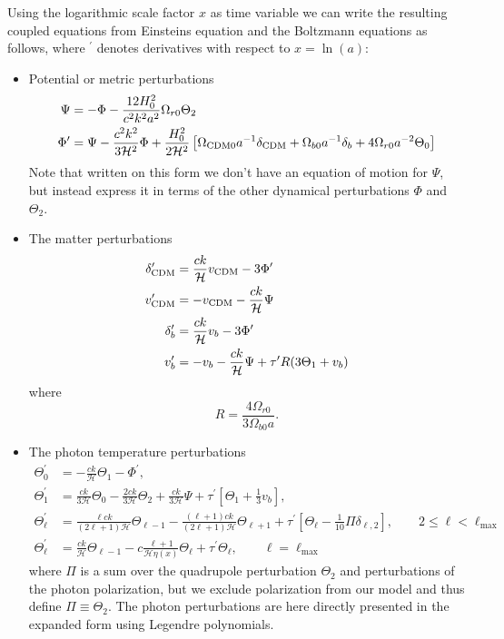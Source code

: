 \documentclass[10pt,a4paper]{article}
\begin{document}
Using the logarithmic scale factor $x$ as time variable we can write the resulting coupled equations from Einsteins equation and the Boltzmann equations as follows, where $^\prime$ denotes derivatives with respect to $x = \ln(a)$:
\begin{itemize}
\item Potential or metric perturbations
\begin{align}
  \Psi &= -\Phi - \frac{12H_0^2}{c^2k^2a^2}\Omega_{r0}\Theta_2 \label{eq:Psi}
  \\
  \Phi^\prime &= \Psi - \frac{c^2k^2}{3\mathcal{H}^2} \Phi + \frac{H_0^2}{2\mathcal{H}^2}
  \left[\Omega_{\rm CDM 0} a^{-1} \delta_{\rm CDM} + \Omega_{b0} a^{-1} \delta_b + 4\Omega_{r0}
  a^{-2}\Theta_0\right]
\end{align}%
Note that written on this form we don't have an equation of motion for $\Psi$, but instead express it in terms of the other dynamical perturbations $\Phi$ and $\Theta_2$.

\item The matter perturbations
\begin{align}
  \delta_{\rm CDM}^\prime &= \frac{ck}{\mathcal{H}} v_{\rm CDM} - 3\Phi^\prime \\
  v_{\rm CDM}^\prime &= -v_{\rm CDM} -\frac{ck}{\mathcal{H}} \Psi \\
  \delta_b^\prime &= \frac{ck}{\mathcal{H}}v_b -3\Phi^\prime \\
  v_b^\prime &= -v_b - \frac{ck}{\mathcal{H}}\Psi + \tau^\prime R(3\Theta_1 + v_b)
\end{align}
where
\begin{equation}
  R = \frac{4\Omega_{r0}}{3\Omega_{b0}a}.
  \label{eq:R}
\end{equation}

\item The photon temperature perturbations
\begin{align}
  \Theta^\prime_0 &= -\frac{ck}{\mathcal{H}} \Theta_1 - \Phi^\prime,
  \\
  \Theta^\prime_1 &=  \frac{ck}{3\mathcal{H}} \Theta_0 - \frac{2ck}{3\mathcal{H}}\Theta_2 +
  \frac{ck}{3\mathcal{H}}\Psi + \tau^\prime\left[\Theta_1 + \frac{1}{3}v_b\right],
  \label{eq:dipole ODE}
  \\
  \Theta^\prime_\ell &= \frac{\ell ck}{(2\ell+1)\mathcal{H}}\Theta_{\ell-1} - \frac{(\ell+1)ck}{(2\ell+1)\mathcal{H}}
  \Theta_{\ell+1} + \tau^\prime\left[\Theta_\ell - \frac{1}{10}\Pi
  \delta_{\ell,2}\right], \quad\quad 2 \leq \ell < \ell_{\textrm{max}}
  \\
  \Theta_{\ell}^\prime &= \frac{ck}{\mathcal{H}}
  \Theta_{\ell-1}-c\frac{\ell+1}{\mathcal{H}\eta(x)}\Theta_\ell+\tau^\prime\Theta_\ell,
  \quad\quad \ell = \ell_{\textrm{max}}
\end{align}
where $\Pi$ is a sum over the quadrupole perturbation $\Theta_2$ and perturbations of the photon polarization, but we exclude polarization from our model and thus define $\Pi \equiv \Theta_2$. The photon perturbations are here directly presented in the expanded form using Legendre polynomials.


\end{itemize}
\end{document}
